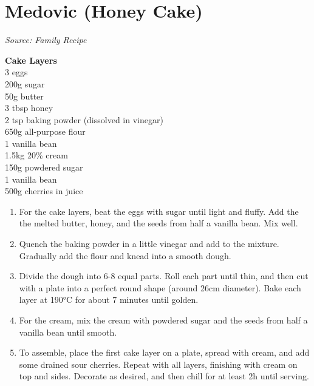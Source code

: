 \documentclass{report}
\begin{document}
\section[Medovic]{Medovic (Honey Cake)}
\textit{Source: Family Recipe}\\
\begin{minipage}[t]{0.21\textwidth} \vspace{0pt}
\textbf{Cake Layers}\\
3 eggs\\
200g sugar\\
50g butter\\
3 tbsp honey\\
2 tsp baking powder (dissolved in vinegar)\\
650g all-purpose flour\\
1 vanilla bean\\
1.5kg 20\% cream\\
150g powdered sugar\\
1 vanilla bean\\
500g cherries in juice
\end{minipage}
\hfill
\begin{minipage}[t]{0.78\textwidth} \vspace{0pt}
	\begin{enumerate}
		\item For the cake layers, beat the eggs with sugar until light and fluffy. Add the the melted butter, honey, and the seeds from half a vanilla bean. Mix well.
		\item Quench the baking powder in a little vinegar and add to the mixture. Gradually add the flour and knead into a smooth dough.
		\item Divide the dough into 6-8 equal parts. Roll each part until thin, and then cut with a plate into a perfect round shape (around 26cm diameter). Bake each layer at 190°C for about 7 minutes until golden.
		\item For the cream, mix the cream with powdered sugar and the seeds from half a vanilla bean until smooth.
		\item To assemble, place the first cake layer on a plate, spread with cream, and add some drained sour cherries. Repeat with all layers, finishing with cream on top and sides. Decorate as desired, and then chill for at least 2h until serving.
	\end{enumerate}
\end{minipage}
\end{document}
